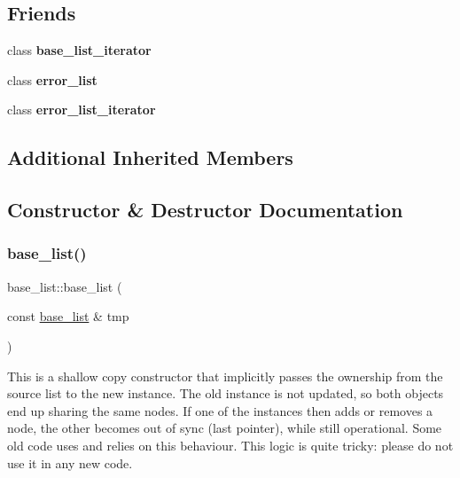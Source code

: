 \subsection*{Friends}
\begin{DoxyCompactItemize}
\item 
\mbox{\label{classbase__list_ae96dee6b0b1d984625808c8b7bebd3f6}} 
class {\bfseries base\+\_\+list\+\_\+iterator}
\item 
\mbox{\label{classbase__list_a2a207022234994711ffaf2ff6c58d2aa}} 
class {\bfseries error\+\_\+list}
\item 
\mbox{\label{classbase__list_a7251d6207a206c654ca359fde3dd4060}} 
class {\bfseries error\+\_\+list\+\_\+iterator}
\end{DoxyCompactItemize}
\subsection*{Additional Inherited Members}


\subsection{Constructor \& Destructor Documentation}
\mbox{\label{classbase__list_a24d6d72225c4f733291ddaca494cf84a}} 
\subsubsection{\texorpdfstring{base\+\_\+list()}{base\_list()}\hspace{0.1cm}{\footnotesize\ttfamily [1/2]}}
{\footnotesize\ttfamily base\+\_\+list\+::base\+\_\+list (\begin{DoxyParamCaption}\item[{const \mbox{\hyperlink{classbase__list}{base\+\_\+list}} \&}]{tmp }\end{DoxyParamCaption})\hspace{0.3cm}{\ttfamily [inline]}}

This is a shallow copy constructor that implicitly passes the ownership from the source list to the new instance. The old instance is not updated, so both objects end up sharing the same nodes. If one of the instances then adds or removes a node, the other becomes out of sync (\textquotesingle{}last\textquotesingle{} pointer), while still operational. Some old code uses and relies on this behaviour. This logic is quite tricky\+: please do not use it in any new code. \mbox{\label{classbase__list_a3a29753a509aeb6df2ea457796fab004}} 
